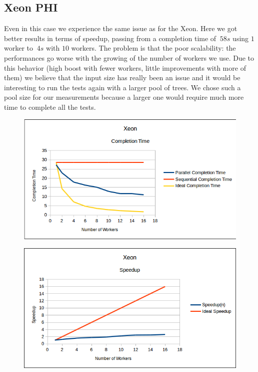 \documentclass[10pt]{article}
\numberwithin{equation}{section}
\begin{document}
\subsection{Xeon PHI}
Even in this case we experience the same issue as for the Xeon. Here we got better results in terms of speedup, passing from a completion time of $~58s$ using $1$ worker to $~4s$ with $10$ workers. The problem is that the poor scalability: the performances go worse with the growing of the number of workers we use. Due to this behavior (high boost with fewer workers, little improvements with more of them) we believe that the input size has really been an issue and it would be interesting to run the tests again with a larger pool of trees. We chose such a pool size for our measurements because a larger one would require much more time to complete all the tests.

\begin{figure} 
	\centering
	\includegraphics[scale=.75]{Xeon_CompletionTime.png}
	\label{fig:xeoncompletiontime}
\end{figure}

\begin{figure} 
	\centering
	\includegraphics[scale=.75]{Xeon_Speedup.png}
	\label{fig:xeonspeeduptime}
\end{figure}
\end{document}
